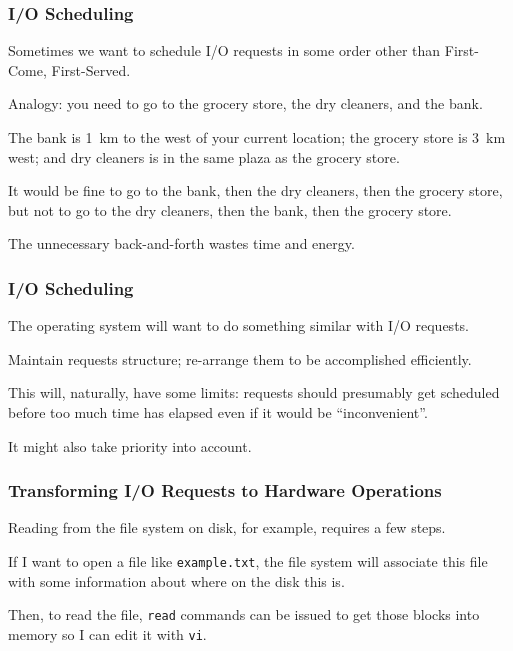 \begin{frame}
\frametitle{I/O Scheduling}

Sometimes we want to schedule I/O requests in some order other than First-Come, First-Served. 

Analogy: you need to go to the grocery store, the dry cleaners, and the bank. 

The bank is 1~km to the west of your current location; the grocery store is 3~km west; and dry cleaners is in the same plaza as the grocery store. 

It would be fine to go to the bank, then the dry cleaners, then the grocery store, but not to go to the dry cleaners, then the bank, then the grocery store. 

The unnecessary back-and-forth wastes time and energy.


\end{frame}

\begin{frame}
\frametitle{I/O Scheduling}
The operating system will want to do something similar with I/O requests.

Maintain requests structure; re-arrange them to be accomplished efficiently.

This will, naturally, have some limits: requests should presumably get scheduled before too much time has elapsed even if it would be ``inconvenient''. 

It might also take priority into account. 

\end{frame}



\begin{frame}
\frametitle{Transforming I/O Requests to Hardware Operations}

Reading from the file system on disk, for example, requires a few steps. 

If I want to open a file like \texttt{example.txt}, the file system will associate this file with some information about where on the disk this is. 

Then, to read the file, \texttt{read} commands can be issued to get those blocks into memory so I can edit it with \texttt{vi}.

\end{frame}

